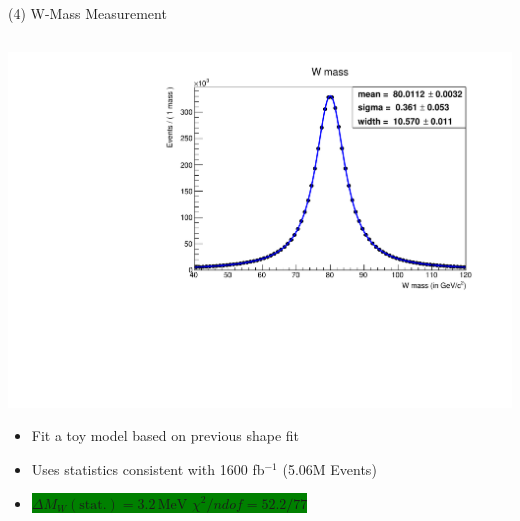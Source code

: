 \documentclass[10pt]{beamer}
\begin{document}
\begin{frame}{(4) W-Mass Measurement }
\begin{columns}
\begin{column}{0.5\textwidth}
\includegraphics[scale=0.3, left]{toymass.pdf} \\
\begin{itemize}
\item Fit a toy model based on previous shape fit
\item Uses statistics consistent with 1600 fb$^{-1}$ (5.06M Events)
\item \colorbox{green}{$\Delta M_W (\text{stat.}) = 3.2 \, \text{MeV} \, \, \chi^2/ndof = 52.2/77$ }
\end{itemize}
\end{column}
\end{columns}
\quad \quad \\
\quad \quad \\

\end{frame}
\end{document}
